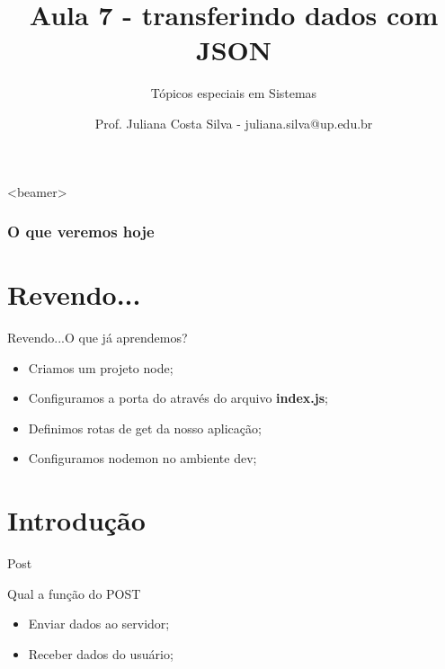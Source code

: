 \documentclass{beamer}
\title{Aula 7  - transferindo dados com JSON}
\subtitle{Tópicos especiais em Sistemas}
\author{Prof. Juliana Costa Silva - juliana.silva@up.edu.br}
\begin{document}
  \frame[c]{\maketitle}
      \begin{frame}<beamer>
      \frametitle{O que veremos hoje}
      \tableofcontents
    \end{frame}
    \section{Revendo...}
    \begin{frame}{Revendo...}{O que já aprendemos?}
      
      \begin{itemize}
            \item Criamos um projeto node;
            \item Configuramos a porta do através do arquivo \textbf{index.js};
            \item Definimos rotas de get da nosso aplicação;
            \item Configuramos nodemon no ambiente dev;
       \end{itemize}
     \end{frame}
\section{Introdução}
    \begin{frame}[label=lists]{Post}
    \begin{exampleblock}{Qual a função do POST}
        	\begin{itemize}
	\item Enviar dados ao servidor;
	\item Receber dados do usuário;
        	\end{itemize}
      \end{exampleblock}
    \end{frame}
\end{document}
